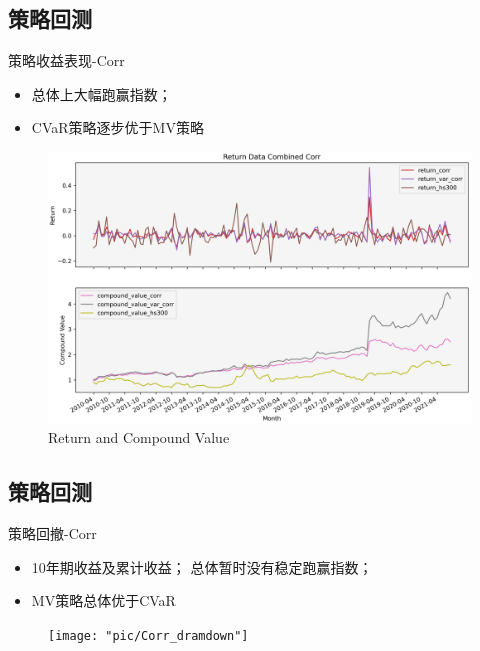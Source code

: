 \documentclass[CJK,aspectratio=43]{beamer}  %
\begin{document}
\subsection{策略回测}
\begin{frame}{策略收益表现-Corr}
	\begin{itemize}
	\item 总体上大幅跑赢指数； 
	\item CVaR策略逐步优于MV策略
	\end{itemize}
	\begin{figure}
		\centering
		\includegraphics[width=0.8\linewidth]{pic/Corr}
		\caption{Return and Compound Value}
		\label{fig:corr}
	\end{figure}
\end{frame}

\subsection{策略回测}
\begin{frame}{策略回撤-Corr}
	\begin{itemize}
		\item 10年期收益及累计收益； 总体暂时没有稳定跑赢指数； 
		\item MV策略总体优于CVaR
	\end{itemize}
	\begin{figure}
		\centering
		\texttt{[image: "pic/Corr\_dramdown"]}
		\caption{}
		\label{fig:corrdramdown}
	\end{figure}
\end{frame}
\end{document}

